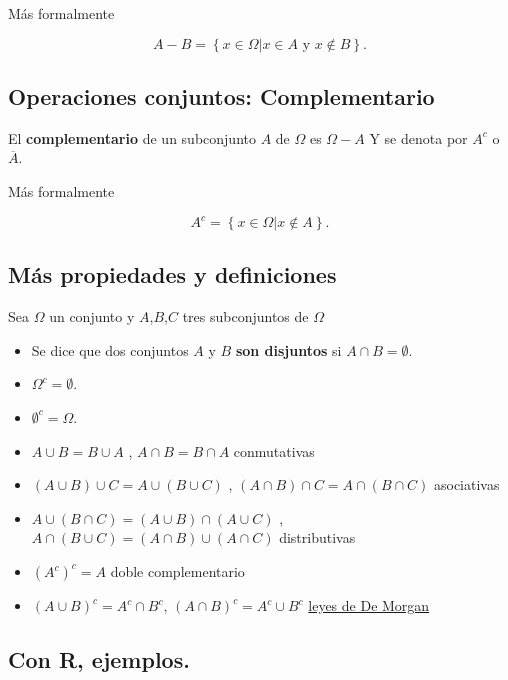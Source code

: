 \documentclass[]{book}
\providecommand{\tightlist}{%
  \setlength{\itemsep}{0pt}\setlength{\parskip}{0pt}}
\begin{document}
Más formalmente

\[
A- B=\left\{x\in\Omega \big| x\in A \mbox{ y } x\notin B\right\}.
\]

\hypertarget{operaciones-conjuntos-complementario}{%
\subsection{Operaciones conjuntos: Complementario}\label{operaciones-conjuntos-complementario}}

El \textbf{complementario} de un subconjunto \(A\) de \(\Omega\) es \(\Omega-A\) Y se denota por \(A^c\) o \(\overline{A}\).

Más formalmente

\[
A^c=\left\{x\in\Omega \big| x\not\in A\right\}.
\]

\hypertarget{muxe1s-propiedades-y-definiciones}{%
\subsection{Más propiedades y definiciones}\label{muxe1s-propiedades-y-definiciones}}

Sea \(\Omega\) un conjunto y \(A\),\(B\),\(C\) tres subconjuntos de \(\Omega\)

\begin{itemize}
\tightlist
\item
  Se dice que dos conjuntos \(A\) y \(B\) \textbf{son disjuntos} si \(A\cap B=\emptyset.\)
\item
  \(\Omega^c=\emptyset\).
\item
  \(\emptyset^c=\Omega\).
\item
  \(A\cup B=B \cup A\) , \(A\cap B=B\cap A\) conmutativas
\item
  \((A\cup B) \cup C = A \cup( B \cup C)\) , \((A\cap B) \cap C = A \cap( B \cap C)\) asociativas
\item
  \(A\cup (B\cap C)=(A\cup B) \cap (A\cup C)\) , \(A\cap (B\cup C)=(A\cap B) \cup (A\cap C)\) distributivas
\item
  \(\left(A^c\right)^c=A\) doble complementario
\item
  \(\left(A\cup B\right)^c=A^c \cap B^c\), \(\left(A\cap B\right)^c=A^c \cup B^c\) \href{https://es.wikipedia.org/wiki/Leyes_de_De_Morgan}{leyes de De Morgan}
\end{itemize}

\hypertarget{con-r-ejemplos.}{%
\subsection{Con R, ejemplos.}\label{con-r-ejemplos.}}
\end{document}
